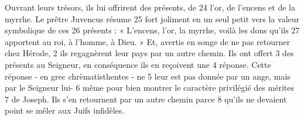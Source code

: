 Ouvrant leurs trésors, ils lui offrirent des présents, de	 
24	 	l'or, de l'encens et de la myrrhe. Le prêtre Juvencus résume	 
25	 	fort joliment en un seul petit vers la valeur symbolique de ces	 
26	 	présents : « L'encens, l'or, la myrrhe, voilà les dons qu'ils	 
27	 	apportent au roi, à l'homme, à Dieu. »
Et, avertis en songe de ne pas retourner chez Hérode,	 
2	 	ils regagnèrent leur pays par un autre chemin. Ils ont offert	 
3	 	des présents au Seigneur, en conséquence ils en reçoivent une	 
4	 	réponse. Cette réponse - en grec chrèmatisthentes - ne	 
5	 	leur est pas donnée par un ange, mais par le Seigneur lui-	 
6	 	même pour bien montrer le caractère privilégié des mérites	 
7	 	de Joseph. Ils s'en retournent par un autre chemin parce	 
8	 	qu'ils ne devaient point se mêler aux Juifs infidèles.
